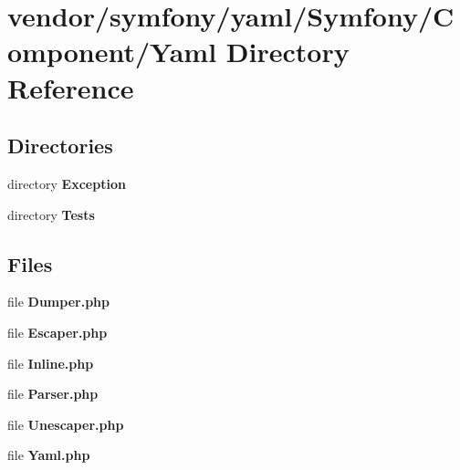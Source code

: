 \section{vendor/symfony/yaml/\+Symfony/\+Component/\+Yaml Directory Reference}
\label{dir_d5222831ab30470bd10b4d2dd674bb12}
\subsection*{Directories}
\begin{DoxyCompactItemize}
\item 
directory {\bf Exception}
\item 
directory {\bf Tests}
\end{DoxyCompactItemize}
\subsection*{Files}
\begin{DoxyCompactItemize}
\item 
file {\bf Dumper.\+php}
\item 
file {\bf Escaper.\+php}
\item 
file {\bf Inline.\+php}
\item 
file {\bf Parser.\+php}
\item 
file {\bf Unescaper.\+php}
\item 
file {\bf Yaml.\+php}
\end{DoxyCompactItemize}
